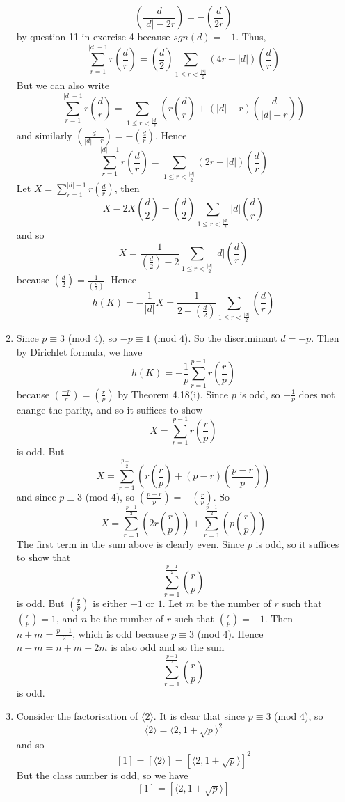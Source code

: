 \begin{enumerate}
$$\left(\frac{d}{|d|-2r}\right)=-\left(\frac{d}{2r}\right)$$
by question 11 in exercise 4 because $sgn(d)=-1$. Thus,
$$\sum_{r=1}^{|d|-1}r\left(\frac{d}{r}\right)=\left(\frac{d}{2}\right)\sum_{1 \le r <\frac{|d|}{2}}
(4r-|d|)\left(\frac{d}{r}\right)$$
But we can also write
$$\sum_{r=1}^{|d|-1}r\left(\frac{d}{r}\right)=\sum_{1 \le r <\frac{|d|}{2}}\left(r\left(\frac{d}{r}\right)
+(|d|-r)\left(\frac{d}{|d|-r}\right)\right)$$
and similarly $(\frac{d}{|d|-r})=-(\frac{d}{r})$. Hence
$$\sum_{r=1}^{|d|-1}r\left(\frac{d}{r}\right)=\sum_{1 \le r <\frac{|d|}{2}}(2r-|d|)\left(\frac{d}{r}\right)$$
Let $X=\sum_{r=1}^{|d|-1}r(\frac{d}{r})$, then
$$X-2X\left(\frac{d}{2}\right)=\left(\frac{d}{2}\right)\sum_{1 \le r<\frac{|d|}{2}} |d|\left(\frac{d}{r}\right)$$
and so
$$X=\frac{1}{\left(\frac{d}{2}\right)-2}\sum_{1\le r <\frac{|d|}{2}}|d|\left(\frac{d}{r}\right)$$
because $(\frac{d}{2})=\frac{1}{(\frac{d}{2})}$. Hence
$$h(K)=-\frac{1}{|d|}X=\frac{1}{2-\left(\frac{d}{2}\right)}\sum_{1 \le r <\frac{|d|}{2}}\left(\frac{d}{r}\right)$$
\item Since $p \equiv 3$ (mod $4$), so $-p \equiv 1$ (mod $4$). So the discriminant $d=-p$.
Then by Dirichlet formula, we have
$$h(K)=-\frac{1}{p} \sum_{r=1}^{p-1} r\left(\frac{r}{p}\right)$$
because $(\frac{-p}{r})=(\frac{r}{p})$ by Theorem 4.18(i). Since $p$ is odd, so
$-\frac{1}{p}$ does not change the parity, and so it suffices to show
$$X=\sum_{r=1}^{p-1}r \left(\frac{r}{p}\right)$$
is odd.
But
$$X=\sum_{r=1}^{\frac{p-1}{2}} \left(r\left(\frac{r}{p}\right)+(p-r)\left(\frac{p-r}{p}\right)\right)$$
and since $p \equiv 3$ (mod $4$), so $(\frac{p-r}{p})=-(\frac{r}{p})$. So
$$X=\sum_{r=1}^{\frac{p-1}{2}}\left(2r\left(\frac{r}{p}\right)\right)+\sum_{r=1}^{\frac{p-1}{2}}
\left(p\left(\frac{r}{p}\right)\right)$$
The first term in the sum above is clearly even. Since $p$ is odd, so it suffices to show that
$$\sum_{r=1}^{\frac{p-1}{2}} \left(\frac{r}{p}\right)$$
is odd. But $(\frac{r}{p})$ is either $-1$ or $1$. Let $m$ be the number of $r$ such that $(\frac{r}{p})=1$,
and $n$ be the number of $r$ such that $(\frac{r}{p})=-1$.
Then $n+m=\frac{p-1}{2}$, which is odd because $p \equiv 3$ (mod $4$).
Hence $n-m=n+m-2m$ is also odd and so the sum
$$\sum_{r=1}^{\frac{p-1}{2}} \left(\frac{r}{p}\right)$$
is odd.
\item Consider the factorisation of $\langle 2 \rangle$. It is clear that since $p \equiv 3$ (mod $4$), so
$$\langle 2 \rangle=\langle 2,1+\sqrt{p} \rangle^2$$
and so
$$[1]=[\langle 2 \rangle]=[\langle 2,1+\sqrt{p}\rangle]^2$$
But the class number is odd, so we have
$$[1]=[\langle 2,1+\sqrt{p} \rangle]$$

\end{enumerate}
